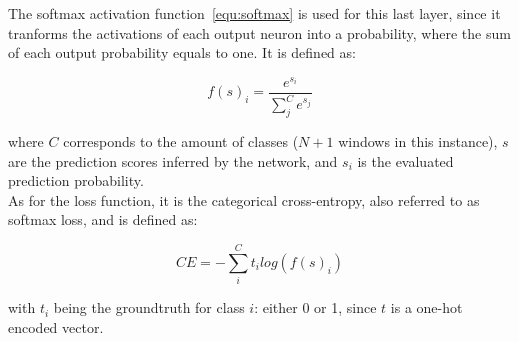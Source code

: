 The softmax activation function~\ref{equ:softmax} is used for this last layer,
since it tranforms the activations of each output neuron into a probability,
where the sum of each output probability equals to one. It is defined as:

\begin{equation}
	\label{equ:softmax}
	f(s)_i=\frac{e^{s_i}}{\sum_j^C e^{s_j}}
\end{equation}

where $C$ corresponds to the amount of classes ($N+1$ windows in this
instance), $s$ are the prediction scores inferred by the network, and $s_i$ is
the evaluated prediction probability.\\

As for the loss function, it is the categorical cross-entropy, also referred to
as softmax loss, and is defined as:

\begin{equation}
	\label{equ:catcrossentr}
	CE=\displaystyle-\sum_i^C t_i log(f(s)_i)
\end{equation}

with $t_i$ being the groundtruth for class $i$: either 0 or 1, since $t$ is a
one-hot encoded vector.

